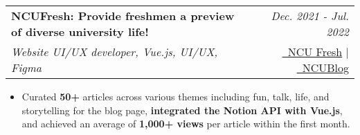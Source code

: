 \documentclass[a4paper,11pt]{article}
\makeatletter
\newcommand{\resumeSubheading}[4]{
\vspace{0.5mm}\item
    \begin{tabular*}{0.98\textwidth}[t]{l@{\extracolsep{\fill}}r}
        \textbf{#1} & \textit{\footnotesize{#4}} \\
        \textit{\footnotesize{#3}} &  \footnotesize{#2}\\
    \end{tabular*}
    \vspace{-2.4mm}
}
\newcommand{\resumeItemListStart}{\begin{justify}\begin{itemize}[
    leftmargin=3ex, 
    rightmargin=2ex, 
    noitemsep,
    labelsep=1.2mm,
    itemsep=0.5mm
    ]\small
}
\newcommand{\resumeItemListEnd}{\end{itemize}\end{justify}\vspace{-2mm}}
\makeatother
\begin{document}
        \vspace{-2.0mm}

        \resumeSubheading
            { NCUFresh: Provide freshmen a preview of diverse university life!} 
            {
                \href{https://github.com/ncufresh}{\faGithub\ NCU Fresh} 
                |
                \href{https://22.ncufresh.ncu.edu.tw/blog/}{\textcolor{black}{\faDesktop}\ NCUBlog} 
            }%
            {Website UI/UX developer, Vue.js, UI/UX, Figma}%
            {Dec. 2021 - Jul. 2022} %

            \vspace{-1.0mm}

            \resumeItemListStart
                \item {Curated \textbf{50+} articles across various themes including fun, talk, life, and storytelling for the blog page, \textbf{integrated the Notion API with Vue.js}, and achieved an average of \textbf{1,000+ views} per article within the first month.}
            \resumeItemListEnd






\end{document}
